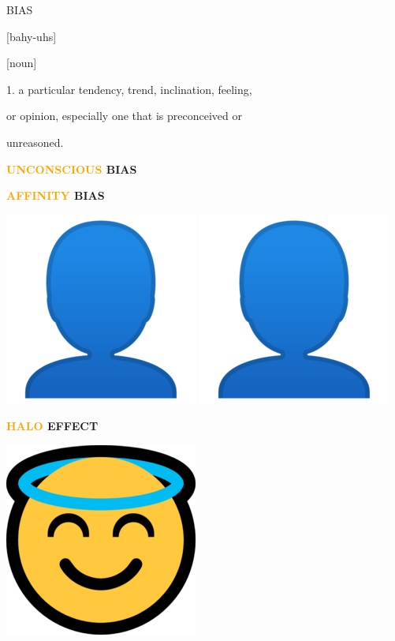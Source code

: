 \documentclass{beamer}
\begin{document}
\begin{frame}
    \begin{center}
    \begin{minipage}{.5\textwidth}
        \LARGE{BIAS}
    \end{minipage}
    \begin{minipage}{.3\textwidth}
        \normalsize{[bahy-uhs]}
    \end{minipage}
    \vspace{.5cm}

    \hspace{-8cm} \normalsize{[noun]}\\
    \end{center}
    \hspace{.8cm} \normalsize{1. a particular tendency, trend, inclination, feeling,}

    \hspace{1cm} \normalsize{or opinion, especially one that is preconceived or}

    \hspace{1cm} \normalsize{unreasoned.}
\end{frame}

\begin{frame}
    \begin{center}
        \textbf{\Large{\textcolor{orange}{UNCONSCIOUS} BIAS}}
    \end{center}
\end{frame}

\begin{frame}
    \begin{center}
        \textbf{\Large{\textcolor{orange}{AFFINITY} BIAS}}
        \vspace{.5cm}

        \includegraphics[width=.1\textwidth]{static/person.png}
        \includegraphics[width=.1\textwidth]{static/person.png}
    \end{center}
\end{frame}

\begin{frame}
    \begin{center}
        \textbf{\Large{\textcolor{orange}{HALO} EFFECT}}
        \vspace{.5cm}

        \includegraphics[width=.1\textwidth]{static/halo.png}
    \end{center}
\end{frame}
\end{document}
